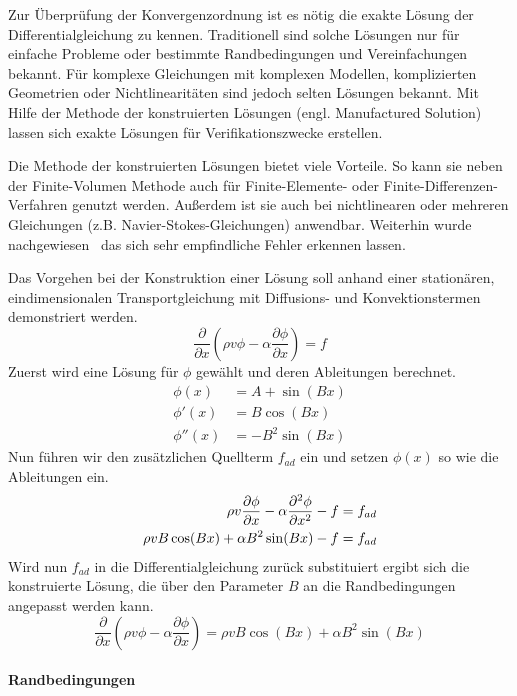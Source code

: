 Zur Überprüfung der Konvergenzordnung ist es nötig die exakte Lösung der Differentialgleichung zu
kennen. Traditionell sind solche Lösungen nur für einfache Probleme oder bestimmte Randbedingungen
und Vereinfachungen bekannt. Für komplexe Gleichungen mit komplexen Modellen, komplizierten Geometrien
oder Nichtlinearitäten sind jedoch selten Lösungen bekannt. Mit Hilfe der Methode der konstruierten
Lösungen (engl. Manufactured Solution) lassen sich exakte Lösungen für Verifikationszwecke erstellen.

Die Methode der konstruierten Lösungen bietet viele Vorteile. So kann sie neben der Finite-Volumen Methode auch
für Finite-Elemente- oder Finite-Differenzen-Verfahren genutzt werden. Außerdem ist sie auch bei nichtlinearen
oder mehreren Gleichungen (z.B. Navier-Stokes-Gleichungen) anwendbar. Weiterhin wurde nachgewiesen~\cite{roache_book} das sich
sehr empfindliche Fehler erkennen lassen.

Das Vorgehen bei der Konstruktion einer Lösung soll anhand einer stationären, eindimensionalen Transportgleichung
mit Diffusions- und Konvektionstermen demonstriert werden.
\begin{equation*}
  \frac{\partial}{\partial x} \left({\rho v \phi
- \alpha \frac{\partial \phi}{\partial x} }\right) = f
\end{equation*}
Zuerst wird eine Lösung für $\phi$ gewählt und deren Ableitungen berechnet.
\begin{align*}
  \phi(x) &= A + \sin(Bx)\\
  \phi'(x) &= B \cos(Bx)\\
  \phi''(x) &= -B^2\sin(Bx)
\end{align*}
Nun führen wir den zusätzlichen Quellterm $f_{ad}$ ein und setzen $\phi(x)$ so wie die Ableitungen ein.
\begin{align*}
  \rho v \pder[\phi]{x} - \alpha\frac{\partial^2 \phi}{\partial x^2}-f&=f_{ad}\\
  \rho v B \cos(Bx) + \alpha B^2 \sin(Bx) - f &= f_{ad}
\end{align*}
Wird nun $f_{ad}$ in die Differentialgleichung zurück substituiert ergibt sich die
konstruierte Lösung, die über den Parameter $B$ an die Randbedingungen angepasst werden kann.
\begin{equation}
   \frac{\partial}{\partial x} \left({\rho v \phi
- \alpha \frac{\partial \phi}{\partial x} }\right)= \rho v B \cos(Bx) + \alpha B^2 \sin(Bx)
\end{equation}

\paragraph{Randbedingungen}

